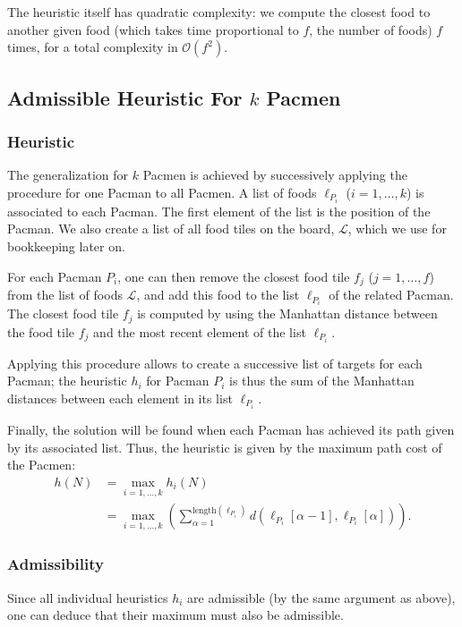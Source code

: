 \documentclass[journal]{IEEEtran}
\begin{document}
The heuristic itself has quadratic complexity: we compute the closest food to another given food (which takes time proportional to \(f\), the number of foods) \(f\) times, for a total complexity in \(\mathcal{O}(f^2)\).

\subsection{Admissible Heuristic For \(k\) Pacmen}
\subsubsection{Heuristic}
The generalization for $k$ Pacmen is achieved by successively applying the procedure for one Pacman to all Pacmen.
A list of foods $\ell_{P_i}$ ($i=1,\dots,k$) is associated to each Pacman.
The first element of the list is the position of the Pacman.
We also create a list of all food tiles on the board, \(\mathscr{L}\), which we use for bookkeeping later on.

For each Pacman $P_i$, one can then remove the closest food tile $f_j$ ($j=1,\dots,f$) from the list of foods \(\mathscr{L}\), and add this food to the list $\ell_{P_i}$ of the related Pacman.
The closest food tile $f_j$ is computed by using the Manhattan distance between the food tile $f_j$ and the most recent element of the list $\ell_{P_i}$.

Applying this procedure allows to create a successive list of targets for each Pacman; the heuristic \(h_i\) for Pacman $P_i$ is thus the sum of the Manhattan distances between each element in its list $\ell_{P_i}$.

Finally, the solution will be found when each Pacman has achieved its path given by its associated list.
Thus, the heuristic is given by the maximum path cost of the Pacmen:
\begin{align*}
 h(N) &= \max_{i = 1,\ldots,k} h_i(N) \\
 &= \max_{i=1,\ldots, k} \left(\sum_{\alpha=1}^{\mathrm{length}(\ell_{P_i})} d\left(\ell_{P_i}[\alpha-1],\ell_{P_i}[\alpha]\right)\right).
\end{align*}

\subsubsection{Admissibility}
Since all individual heuristics \(h_i\) are admissible (by the same argument as above), one can deduce that their maximum must also be admissible.
\end{document}
